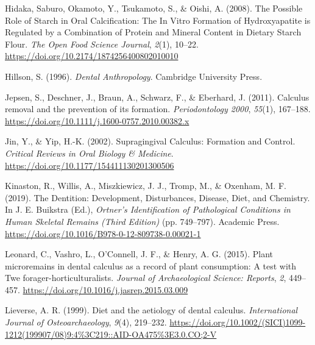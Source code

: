 \documentclass[
  letterpaper,
]{book}
\newlength{\cslhangindent}
\newlength{\cslentryspacingunit} %
\newenvironment{CSLReferences}[2] %
 {%
  \setlength{\parindent}{0pt}
  \ifodd #1
  \let\oldpar\par
  \def\par{\hangindent=\cslhangindent\oldpar}
  \fi
  \setlength{\parskip}{#2\cslentryspacingunit}
 }%
 {}
\begin{document}
\begin{CSLReferences}{1}{0}
\leavevmode{}%
Hidaka, Saburo, Okamoto, Y., Tsukamoto, S., \& Oishi, A. (2008). The
{Possible Role} of {Starch} in {Oral Calcification}: {The In Vitro
Formation} of {Hydroxyapatite} is {Regulated} by a {Combination} of
{Protein} and {Mineral Content} in {Dietary Starch Flour}. \emph{The
Open Food Science Journal}, \emph{2}(1), 10--22.
\url{https://doi.org/10.2174/1874256400802010010}

\leavevmode{}%
Hillson, S. (1996). \emph{Dental {Anthropology}}. {Cambridge University
Press}.

\leavevmode{}%
Jepsen, S., Deschner, J., Braun, A., Schwarz, F., \& Eberhard, J.
(2011). Calculus removal and the prevention of its formation.
\emph{Periodontology 2000}, \emph{55}(1), 167--188.
\url{https://doi.org/10.1111/j.1600-0757.2010.00382.x}

\leavevmode{}%
Jin, Y., \& Yip, H.-K. (2002). Supragingival {Calculus}: {Formation} and
{Control}. \emph{Critical Reviews in Oral Biology \& Medicine}.
\url{https://doi.org/10.1177/154411130201300506}

\leavevmode{}%
Kinaston, R., Willis, A., Miszkiewicz, J. J., Tromp, M., \& Oxenham, M.
F. (2019). The {Dentition}: {Development}, {Disturbances}, {Disease},
{Diet}, and {Chemistry}. In J. E. Buikstra (Ed.), \emph{Ortner's
{Identification} of {Pathological Conditions} in {Human Skeletal
Remains} ({Third Edition})} (pp. 749--797). {Academic Press}.
\url{https://doi.org/10.1016/B978-0-12-809738-0.00021-1}

\leavevmode{}%
Leonard, C., Vashro, L., O'Connell, J. F., \& Henry, A. G. (2015). Plant
microremains in dental calculus as a record of plant consumption: {A}
test with {Twe} forager-horticulturalists. \emph{Journal of
Archaeological Science: Reports}, \emph{2}, 449--457.
\url{https://doi.org/10.1016/j.jasrep.2015.03.009}

\leavevmode{}%
Lieverse, A. R. (1999). Diet and the aetiology of dental calculus.
\emph{International Journal of Osteoarchaeology}, \emph{9}(4), 219--232.
\url{https://doi.org/10.1002/(SICI)1099-1212(199907/08)9:4\%3C219::AID-OA475\%3E3.0.CO;2-V}


\end{CSLReferences}
\end{document}
